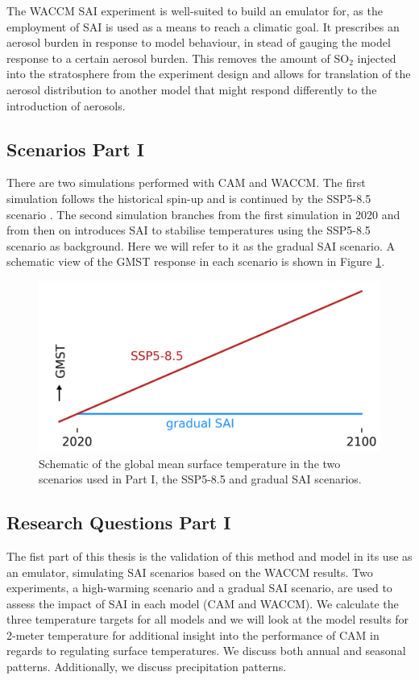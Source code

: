 The WACCM SAI experiment is well-suited to build an emulator for, as the employment of SAI is used as a means to reach a climatic goal. It prescribes an aerosol burden in response to model behaviour, in stead of gauging the model response to a certain aerosol burden. This removes the amount of SO$_2$ injected into the stratosphere from the experiment design and allows for translation of the aerosol distribution to another model that might respond differently to the introduction of aerosols.

\subsection{Scenarios Part I}
There are two simulations performed with CAM and WACCM. The first simulation follows the historical spin-up and is continued by the SSP5-8.5 scenario \parencite{RIAHI2007887}. The second simulation branches from the first simulation in 2020 and from then on introduces SAI to stabilise temperatures using the SSP5-8.5 scenario as background. Here we will refer to it as the gradual SAI scenario. A schematic view of the GMST response in each scenario is shown in Figure \ref{fig:schematic_scens_pt1}.

\begin{figure}[H]
    \centering
    \includegraphics[width=0.6\linewidth]{images/schematic_scens_pt1.png}
    \caption{Schematic of the global mean surface temperature in the two scenarios used in Part I, the SSP5-8.5 and gradual SAI scenarios.}    
    \label{fig:schematic_scens_pt1}
\end{figure}


\newpage
\subsection{Research Questions Part I}
The fist part of this thesis is the validation of this method and model in its use as an emulator, simulating SAI scenarios based on the WACCM results. Two experiments, a high-warming scenario and a gradual SAI scenario, are used to assess the impact of SAI in each model (CAM and WACCM). We calculate the three temperature targets for all models and we will look at the model results for 2-meter temperature for additional insight into the performance of CAM in regards to regulating surface temperatures. We discuss both annual and seasonal patterns. Additionally, we discuss precipitation patterns.

